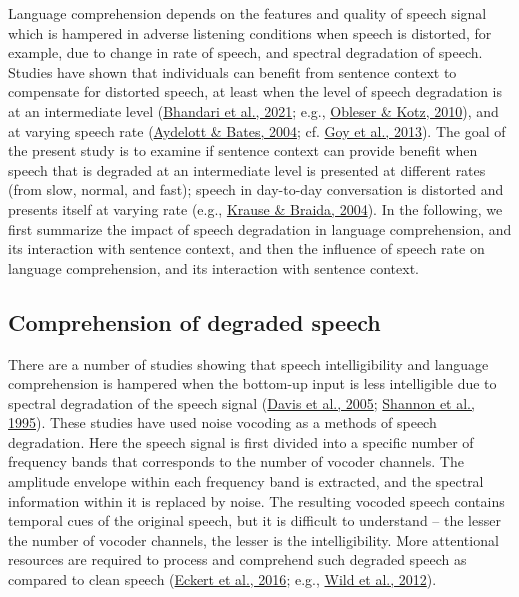 \documentclass[a4paper, nobind]{templates/ociamthesis}
\begin{document}
Language comprehension depends on the features and quality of speech signal
which is hampered in adverse listening conditions when speech is distorted, for example, due to change in rate of speech, and spectral degradation of speech.
Studies have shown that individuals can benefit from sentence context to compensate for distorted speech, at least when the level of speech degradation is at an intermediate level (\protect\hyperlink{ref-Bhandari2021}{Bhandari et al., 2021}; e.g., \protect\hyperlink{ref-Obleser2010}{Obleser \& Kotz, 2010}), and at varying speech rate (\protect\hyperlink{ref-Aydelott2004}{Aydelott \& Bates, 2004}; cf. \protect\hyperlink{ref-Goy2013}{Goy et al., 2013}).
The goal of the present study is to examine if sentence context can provide benefit when speech that is degraded at an intermediate level is presented at different rates (from slow, normal, and fast); speech in day-to-day conversation is distorted and presents itself at varying rate (e.g., \protect\hyperlink{ref-Krause2004}{Krause \& Braida, 2004}).
In the following, we first summarize the impact of speech degradation in language comprehension, and its interaction with sentence context, and then the influence of speech rate on language comprehension, and its interaction with sentence context.

\hypertarget{comprehension-of-degraded-speech}{%
\subsection{Comprehension of degraded speech}\label{comprehension-of-degraded-speech}}

There are a number of studies showing that speech intelligibility and language comprehension is hampered when the bottom-up input is less intelligible due to spectral degradation of the speech signal (\protect\hyperlink{ref-Davis2005}{Davis et al., 2005}; \protect\hyperlink{ref-Shannon1995}{Shannon et al., 1995}).
These studies have used noise vocoding as a methods of speech degradation. Here the speech signal is first divided into a specific number of frequency bands that corresponds to the number of vocoder channels.
The amplitude envelope within each frequency band is extracted, and the spectral information within it is replaced by noise.
The resulting vocoded speech contains temporal cues of the original speech, but it is difficult to understand -- the lesser the number of vocoder channels, the lesser is the intelligibility.
More attentional resources are required to process and comprehend such degraded speech as compared to clean speech (\protect\hyperlink{ref-Eckert2016}{Eckert et al., 2016}; e.g., \protect\hyperlink{ref-Wild2012}{Wild et al., 2012}).
\end{document}
